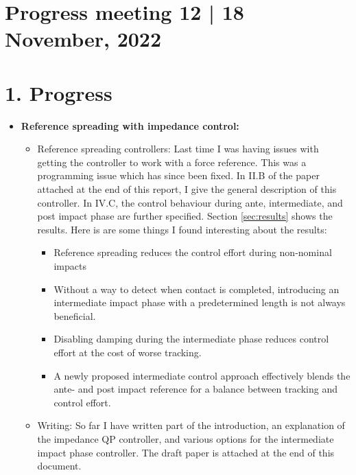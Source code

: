 \documentclass[11pt]{report}
\numberwithin{equation}{section}        %
\numberwithin{figure}{section}          %
\numberwithin{table}{section}           %
\begin{document}
  \section*{Progress meeting 12 | 18 November, 2022}


  \section*{1. Progress}
  \begin{itemize}
  \item \textbf{Reference spreading with impedance control:}

  \begin{itemize}
      \item Reference spreading controllers:
        Last time I was having issues with getting the controller to work with a force reference. This was a programming issue which has since been fixed. In II.B of the paper attached at the end of this report, I give the general description of this controller. In IV.C, the control behaviour during ante, intermediate, and post impact phase are further specified. Section \ref{sec:results} shows the results. Here is are some things I found interesting about the results:
        \begin{itemize}
          \item Reference spreading reduces the control effort during non-nominal impacts
          \item Without a way to detect when contact is completed, introducing an intermediate impact phase with a predetermined length is not always beneficial.
          \item Disabling damping during the intermediate phase reduces control effort at the cost of worse tracking.
          \item A newly proposed intermediate control approach effectively blends the ante- and post impact reference for a balance between tracking and control effort.
        \end{itemize}
      \item Writing: So far I have written part of the introduction, an explanation of the impedance QP controller, and various options for the intermediate impact phase controller. The draft paper is attached at the end of this document.




  \end{itemize}


\end{itemize}
\end{document}
